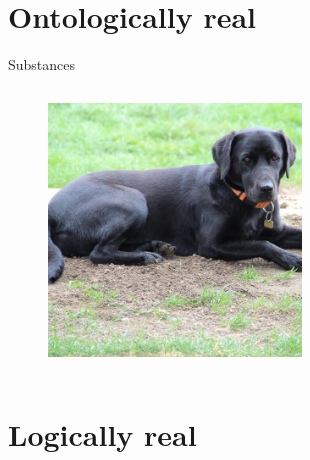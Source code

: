 \documentclass[xcolor=dvipsnames]{beamer}
\begin{document}
\section{Ontologically real}


\begin{frame}[fragile]{Substances}
  \begin{columns}[T] %
    \begin{column}{0.99\textwidth}
      \begin{figure}[H]
        \centering
        \includegraphics[width=0.6\textwidth]{black-lab-dog}
      \end{figure}
    \end{column}%
  \end{columns}
\end{frame}


\section{Logically real}
\end{document}
